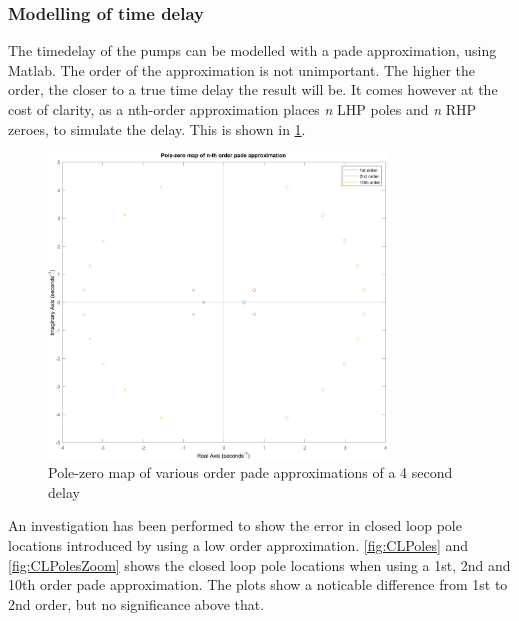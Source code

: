 \subsubsection{Modelling of time delay}
The timedelay of the pumps can be modelled with a pade approximation, using Matlab. The order of the approximation is not unimportant. The higher the order, the closer to a true time delay the result will be. It comes however at the cost of clarity, as a nth-order approximation places \textit{n} LHP poles and \textit{n} RHP zeroes, to simulate the delay. This is shown in \cref{fig:PadeApprox}.
\begin{figure}[h!]
	\centering
	\includegraphics[width=0.8\textwidth]{Pictures/PadeApprox.png}
	\caption{Pole-zero map of various order pade approximations of a 4 second delay}
	\label{fig:PadeApprox}
\end{figure}

An investigation has been performed to show the error in closed loop pole locations introduced by using a low order approximation. \cref{fig:CLPoles} and \cref{fig:CLPolesZoom} shows the closed loop pole locations when using a 1st, 2nd and 10th order pade approximation. The plots show a noticable difference from 1st to 2nd order, but no significance above that.

